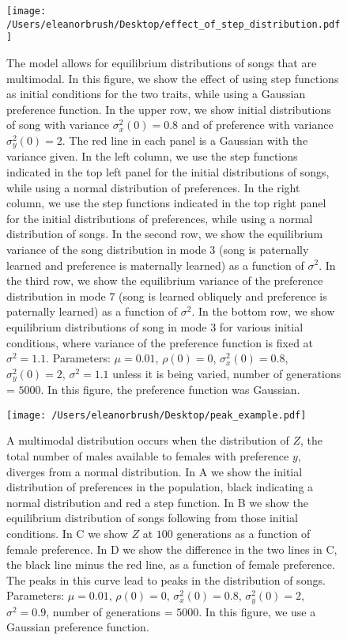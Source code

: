 \documentclass{article}
\begin{document}
\begin{figure}
\texttt{[image: /Users/eleanorbrush/Desktop/effect\_of\_step\_distribution.pdf]}
\caption{\label{effect_of_step_dist}The model allows for equilibrium distributions of songs that are multimodal. In this figure, we show the effect of using step functions as initial conditions for the two traits, while using a Gaussian preference function. In the upper row, we show initial distributions of song with variance $\sigma_x^2(0)=0.8$ and of preference with variance $\sigma_y^2(0)=2$. The red line in each panel is a Gaussian with the variance given. In the left column, we use the step functions indicated in the top left panel for the initial distributions of songs, while using a normal distribution of preferences. In the right column, we use the step functions indicated in the top right panel for the initial distributions of preferences, while using a normal distribution of songs.  In the second row, we show the equilibrium variance of the song distribution in mode $3$ (song is paternally learned and preference is maternally learned) as a function of $\sigma^2$. In the third row, we show the equilibrium variance of the preference distribution in mode $7$ (song is learned obliquely and preference is paternally learned) as a function of $\sigma^2$. In the bottom row, we show equilibrium distributions of song in mode $3$ for various initial conditions, where variance of the preference function is fixed at $\sigma^2=1.1$. Parameters: $\mu=0.01$, $\rho(0)=0$, $\sigma_x^2(0)=0.8$, $\sigma_y^2(0)=2$, $\sigma^2=1.1$ unless it is being varied, number of generations = $5000$. In this figure, the preference function was Gaussian.}
\end{figure}

\begin{figure}
\texttt{[image: /Users/eleanorbrush/Desktop/peak\_example.pdf]}
\caption{\label{peak_example}  A multimodal distribution occurs when the distribution of $Z$, the total number of males available to females with preference $y$, diverges from a normal distribution. In A we show the initial distribution of preferences in the population, black indicating a normal distribution and red a step function. In B we show the equilibrium distribution of songs following from those initial conditions. In C we show $Z$ at $100$ generations as a function of female preference. In D we show the difference in the two lines in C, the black line minus the red line, as a function of female preference. The peaks in this curve lead to peaks in the distribution of songs. Parameters: $\mu=0.01$, $\rho(0)=0$, $\sigma_x^2(0)=0.8$, $\sigma_y^2(0)=2$, $\sigma^2=0.9$, number of generations = $5000$. In this figure, we use a Gaussian preference function. 
}
\end{figure}
\end{document}
